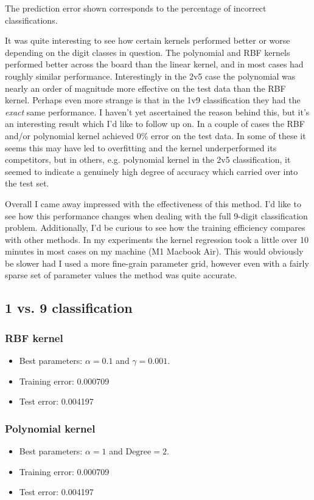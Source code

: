 \documentclass[12pt,a4paper]{article}
\theoremstyle{definition}
\theoremstyle{remark}
\begin{document}
The prediction error shown corresponds to the percentage of incorrect classifications. 

It was quite interesting to see how certain kernels performed better or worse depending on the digit classes in question. The polynomial and RBF kernels performed better across the board than the linear kernel, and in most cases had roughly similar performance. Interestingly in the 2v5 case the polynomial was nearly an order of magnitude more effective on the test data than the RBF kernel. Perhaps even more strange is that in the 1v9 classification they had the \textit{exact} same performance. I haven't yet ascertained the reason behind this, but it's an interesting result which I'd like to follow up on. In a couple of cases the RBF and/or polynomial kernel achieved 0\% error on the test data. In some of these it seems this may have led to overfitting and the kernel underperformed its competitors, but in others, e.g. polynomial kernel in the 2v5 classification, it seemed to indicate a genuinely high degree of accuracy which carried over into the test set. 

Overall I came away impressed with the effectiveness of this method. I'd like to see how this performance changes when dealing with the full 9-digit classification problem. Additionally, I'd be curious to see how the training efficiency compares with other methods. In my experiments the kernel regression took a little over 10 minutes in most cases on my machine (M1 Macbook Air). This would obviously be slower had I used a more fine-grain parameter grid, however even with a fairly sparse set of parameter values the method was quite accurate. 

\subsection{1 vs. 9 classification}
\subsubsection{RBF kernel}
\begin{itemize}
    \item Best parameters: $\alpha = 0.1$ and $\gamma = 0.001$. 
    \item Training error: 0.000709
    \item Test error: 0.004197
\end{itemize}

\subsubsection{Polynomial kernel}
\begin{itemize}
    \item Best parameters: $\alpha = 1$ and $\text{Degree} = 2$. 
    \item Training error: 0.000709
    \item Test error: 0.004197
\end{itemize}
\end{document}
